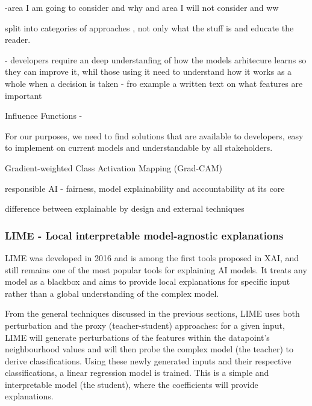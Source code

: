 \documentclass[proposal]{softeng}
\begin{document}
-area I am going to consider and why and area I will not consider and ww


split into categories of approaches , not only what the stuff is and educate the reader.

- developers require an deep understanfing of how the models arhitecure learns so they can improve it, whil those using it need to understand how it works as a whole when a decision is taken - fro example a written text on what features are important 

Influence Functions -




For our purposes, we need to find solutions that are available to developers, easy to implement on current models and understandable by all stakeholders.


Gradient-weighted Class Activation Mapping (Grad-CAM)

responsible AI - fairness, model explainability and accountability at its core

difference between explainable by design and external techniques
\subsubsection{LIME - Local interpretable model-agnostic explanations}
LIME\cite{RibeiroMarcoTulio2016WSIT} was developed in 2016 and is among the first tools proposed in XAI, and still remains one of the most popular tools for explaining AI models. It treats any model as a blackbox and aims to provide local explanations for specific input rather than a global understanding of the complex model.

From the general techniques discussed in the previous sections, LIME uses both perturbation and the proxy (teacher-student) approaches: for a given input, LIME will generate perturbations of the features within the datapoint's neighbourhood values and will then probe the complex model (the teacher) to derive classifications. Using these newly generated inputs and their respective classifications, a linear regression model is trained. This is a simple and interpretable model (the student), where the coefficients will provide explanations.
\end{document}
